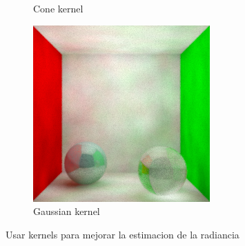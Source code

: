 \documentclass{article}
\begin{document}
\begin{figure}
\begin{subfigure}[h]{0.32\linewidth}
\caption{Cone kernel}
\end{subfigure}
\hfill
\begin{subfigure}[h]{0.32\linewidth}
\includegraphics[width=\linewidth]{imgs/gaussian.png}
\caption{Gaussian kernel}
\end{subfigure}
\caption{Usar kernels para mejorar la estimacion de la radiancia}
\end{figure}
\end{document}
